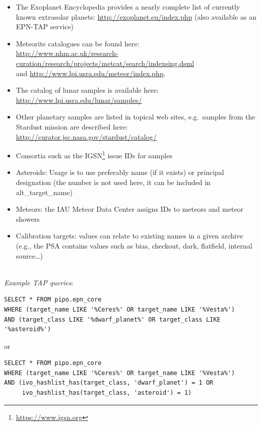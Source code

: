 \documentclass[11pt,a4paper]{ivoa}
\begin{document}
\begin{itemize}
\item The Exoplanet Encyclopedia provides a nearly
complete list of currently known extrasolar planets:
\url{http://exoplanet.eu/index.php}
(also available as an EPN-TAP service)

\item Meteorite catalogues can be found here:\\
\url{http://www.nhm.ac.uk/research-curation/research/projects/metcat/search/indexsing.dsml}
\\and
\url{http://www.lpi.usra.edu/meteor/index.php}.

\item The catalog of lunar samples is available here:
\url{http://www.lpi.usra.edu/lunar/samples/}

\item Other planetary samples are listed in topical web sites,
e.g.\ samples from the Stardust mission are described here:\\
\url{http://curator.jsc.nasa.gov/stardust/catalog/}

\item Consortia such as the IGSN\footnote{\url{https://www.igsn.org}}
issue IDs for samples

\item Asteroids: Usage is to use preferably name (if it exists) or
principal designation (the number is not used here, it can be included
in alt\_target\_name)

\item Meteors: the IAU Meteor Data Center assigns IDs to meteors and
meteor showers

\item Calibration targets: values can relate to existing names in a
given archive (e.g., the PSA contains values such as bias, checkout,
dark, flatfield, internal source…)
\end{itemize}

\textbf{\\}
\emph{Example TAP queries}:

\begin{verbatim}
SELECT * FROM pipo.epn_core
WHERE (target_name LIKE '%Ceres%' OR target_name LIKE '%Vesta%')
AND (target_class LIKE '%dwarf_planet%' OR target_class LIKE '%asteroid%')
\end{verbatim}

or

\begin{verbatim}
SELECT * FROM pipo.epn_core
WHERE (target_name LIKE '%Ceres%' OR target_name LIKE '%Vesta%')
AND (ivo_hashlist_has(target_class, 'dwarf_planet') = 1 OR
     ivo_hashlist_has(target_class, 'asteroid') = 1)
\end{verbatim}
\end{document}
